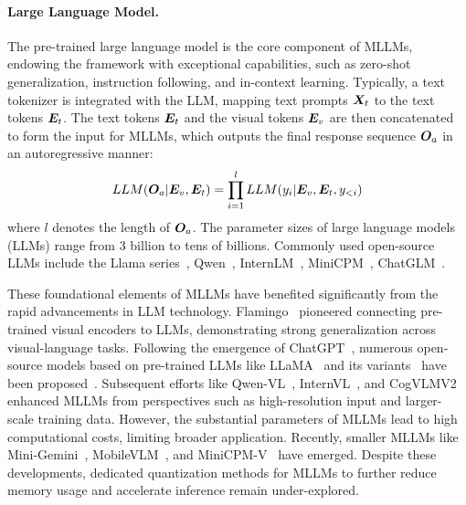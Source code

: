 \paragraph{Large Language Model.} The pre-trained large language model is the core component of MLLMs, endowing the framework with exceptional capabilities, such as zero-shot generalization, instruction following, and in-context learning. Typically, a text tokenizer is integrated with the LLM, mapping text prompts $\boldsymbol{X}_t$ to the text tokens $\boldsymbol{E}_t$. The text tokens $\boldsymbol{E}_t$ and the visual tokens $\boldsymbol{E}_v$ are then concatenated to form the input for MLLMs, which outputs the final response sequence $\boldsymbol{O}_a$ in an autoregressive manner:
\vspace{-3mm}
\begin{equation}
            {LLM}(\mO_a|\mE_v,\mE_t)=\prod^l_{i=1}{LLM}(y_i|\mE_v,\mE_t,y_{<i})
\vspace{-1mm}
\label{eq1}
\end{equation}
where $l$ denotes the length of $\boldsymbol{O}_a$. The parameter sizes of large language models (LLMs) range from 3 billion to tens of billions. Commonly used open-source LLMs include the Llama series~\citep{touvron2023llama,llama2}, Qwen~\citep{qwen}, InternLM~\citep{internlm}, MiniCPM~\citep{hu2024minicpm}, ChatGLM~\citep{chatglm}. 

These foundational elements of MLLMs have benefited significantly from the rapid advancements in LLM technology.  Flamingo~\citep{alayrac2022flamingo} pioneered connecting pre-trained visual encoders to LLMs, demonstrating strong generalization across visual-language tasks. Following the emergence of ChatGPT~\cite{achiam2023gpt}, numerous open-source models based on pre-trained LLMs like LLaMA~\citep{touvron2023llama} and its variants~\citep{llama2, zheng2023vicuna} have been proposed~\citep{li2023blip2, huang2023kosmos1, zhu2023minigpt, liu2023llava}. Subsequent efforts like Qwen-VL~\citep{qwenvl}, InternVL~\citep{chen2024internvl}, and CogVLMV2~\cite{CogVLM2} enhanced MLLMs from perspectives such as high-resolution input and larger-scale training data. However, the substantial parameters of MLLMs lead to high computational costs, limiting broader application. Recently, smaller MLLMs like Mini-Gemini~\citep{li2024minigemini}, MobileVLM~\cite{chu2024mobilevlm2}, and MiniCPM-V~\citep{yao2024minicpmv} have emerged. Despite these developments, dedicated quantization methods for MLLMs to further reduce memory usage and accelerate inference remain under-explored.


\vspace{-2mm}
